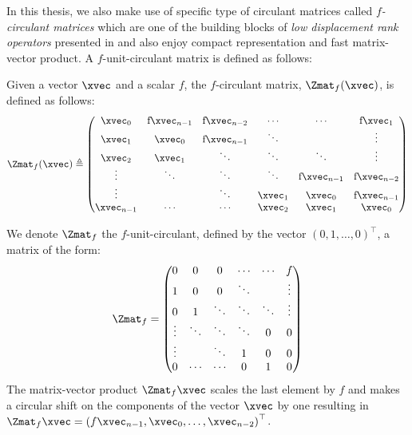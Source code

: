 In this thesis, we also make use of specific type of circulant matrices called \emph{$f$-circulant matrices} which are one of the building blocks of \emph{low displacement rank operators} presented in  and also enjoy compact representation and fast matrix-vector product.
A $f$-unit-circulant matrix is defined as follows:
\begin{definition} \label{definition:ch2-f_circulant_matrix}
  Given a vector $\xvec$ and a scalar $f$, the $f$-circulant matrix, $\Zmat_f(\xvec)$, is defined as follows:
  \begin{equation}
    \Zmat_f(\xvec) \triangleq
    \leftmatrix
      \xvec_0 & $f$ \xvec_{n-1} & $f$ \xvec_{n-2} & \cdots & \cdots & $f$ \xvec_{1} \\
      \xvec_{1} & \xvec_0 & $f$ \xvec_{n-1} & \ddots & & \vdots \\
      \xvec_{2} & \xvec_{1} & \ddots & \ddots & \ddots & \vdots \\ 
      \vdots & \ddots & \ddots & \ddots & $f$ \xvec_{n-1} & $f$ \xvec_{n-2} \\
      \vdots & & \ddots & \xvec_{1} & \xvec_{0} & $f$ \xvec_{n-1} \\
      \xvec_{n-1} & \cdots & \cdots & \xvec_{2} & \xvec_{1} & \xvec_0
    \rightmatrix
  \end{equation}
  \removespace
\end{definition}
\noindent
We denote $\Zmat_f$ the $f$-unit-circulant, defined by the vector $\left(0, 1, \dots, 0 \right)^\top$, a matrix of the form:
\begin{equation}
  \Zmat_f = 
    \leftmatrix
      0      & 0      & 0      & \cdots & \cdots & f      \\
      1      & 0      & 0      & \ddots &        & \vdots \\
      0      & 1      & \ddots & \ddots & \ddots & \vdots \\ 
      \vdots & \ddots & \ddots & \ddots & 0      & 0      \\
      \vdots &        & \ddots & 1      & 0      & 0      \\
      0      & \cdots & \cdots & 0      & 1      & 0
    \rightmatrix
\end{equation}
\noindent
The matrix-vector product $\Zmat_f \xvec$ scales the last element by $f$ and makes a circular shift on the components of the vector $\xvec$ by one resulting in $\Zmat_f \xvec = \leftmat f \xvec_{n-1}, \xvec_0, \dots, \xvec_{n-2} \rightmat^\top$.


